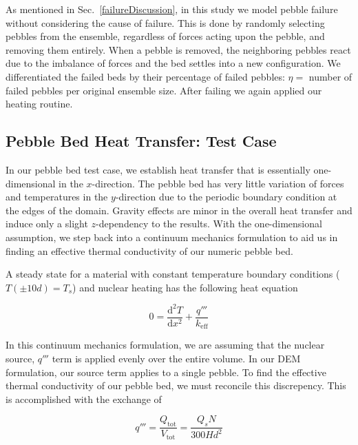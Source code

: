 As mentioned in Sec.~\ref{failureDiscussion}, in this study we model pebble failure without considering the cause of failure. This is done by randomly selecting pebbles from the ensemble, regardless of forces acting upon the pebble, and removing them entirely. When a pebble is removed, the neighboring pebbles react due to the imbalance of forces and the bed settles into a new configuration. We differentiated the failed beds by their percentage of failed pebbles: $\eta = $ number of failed pebbles per original ensemble size. After failing we again applied our heating routine.





\subsection{Pebble Bed Heat Transfer: Test Case}
In our pebble bed test case, we establish heat transfer that is essentially one-dimensional in the $x$-direction. The pebble bed has very little variation of forces and temperatures in the $y$-direction due to the periodic boundary condition at the edges of the domain. Gravity effects are minor in the overall heat transfer and induce only a slight $z$-dependency  to the results. With the one-dimensional assumption, we step back into a continuum mechanics formulation to aid us in finding an effective thermal conductivity of our numeric pebble bed. 

A steady state for a material with constant temperature boundary conditions ($T(\pm 10d) = T_s$) and nuclear heating has the following heat equation

\begin{equation}\label{eq:continuum-heateqn}
	0 = \frac{\mathrm{d}^2T}{\mathrm{d}x^2} + \frac{q'''}{k_\text{eff}}
\end{equation}

In this continuum mechanics formulation, we are assuming that the nuclear source, $q'''$ term is applied evenly over the entire volume. In our DEM formulation, our source term applies to a single pebble. To find the effective thermal conductivity of our pebble bed, we must reconcile this discrepency. This is accomplished  with the exchange of

\begin{equation}
	q''' = \frac{Q_\text{tot}}{V_\text{tot}} = \frac{Q_sN}{300Hd^2}
\end{equation}


